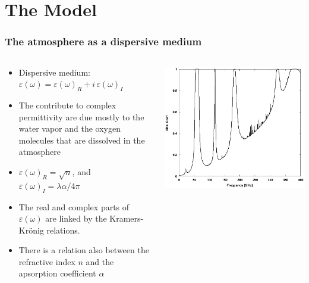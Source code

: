 \documentclass[aspectratio=169]{beamer}
\begin{document}
\section{The Model}
\begin{frame}
    \frametitle{The atmosphere as a dispersive medium}
    \begin{columns}
        \begin{column}{0.6\textwidth}
            \begin{itemize}[<+->]
                \item Dispersive medium: $\varepsilon(\omega) = \varepsilon(\omega)_R + i \,\varepsilon(\omega)_I$

                \item The contribute to complex permittivity are due mostly to the water vapor and the oxygen molecules that are dissolved in the atmosphere

                \item $\varepsilon(\omega)_R = \sqrt{n}$, and $\varepsilon(\omega)_I = \lambda \alpha /  4 \pi$
                \item The real and complex parts of $\varepsilon(\omega)$ are linked by the Kramers-Kr\"onig relations.
                \item There is a relation also between the refractive index $n$ and the apsorption coefficient $\alpha$
            \end{itemize}
        \end{column}
        \begin{column}{0.4\textwidth}
            \includegraphics[scale=0.18]{Abs_Coef.jpg}
        \end{column}
    \end{columns}
\end{frame}
\end{document}
